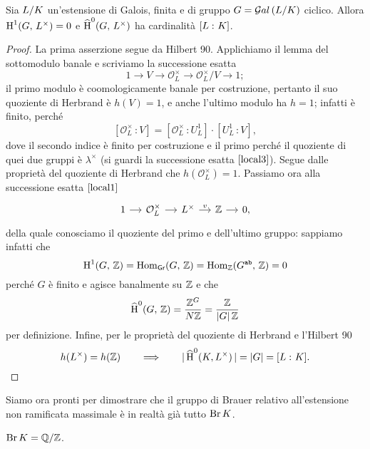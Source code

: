 \begin{theorem} \label{assioma}
	Sia $ L/K $ un'estensione di Galois, finita e di gruppo $ G = \mathcal{G}al\left( L/K \right) $ ciclico. Allora $ \operatorname{H}^1(G, \, L^\times) = 0 $ e $ \operatorname{\widehat{H}}^0(G, \, L^\times) $ ha cardinalità $ [L \, \colon K] $.
\end{theorem}
\begin{proof}
	La prima asserzione segue da Hilbert 90. Applichiamo il lemma del sottomodulo banale e scriviamo la successione esatta 
	\[ 1 \to V \to \mathcal{O}_L^\times \to \mathcal{O}_L^\times/V \to 1; \]
	il primo modulo è coomologicamente banale per costruzione, pertanto il suo quoziente di Herbrand è $ h(V) = 1 $, e anche l'ultimo modulo ha $ h = 1 $; infatti è finito, perché $$  [\mathcal{O}_L^\times \, \colon V] = [\mathcal{O}_L^\times \,\colon U_L^1]\cdot[U_L^1 \,\colon V],  $$
	dove il secondo indice è finito per costruzione e il primo perché il quoziente di quei due gruppi è $ \lambda^\times $ (si guardi la successione esatta $ \ref{local3} $). Segue dalle proprietà del quoziente di Herbrand che $ h(\mathcal{O}_L^\times) = 1 $. Passiamo ora alla successione esatta $ \ref{local1} $
	\[ \begin{tikzcd}[column sep = small]
	1 \rar
	& \mathcal{O}_{L}^\times \rar
	& L^\times \rar["v"]
	& \Z \rar
	& 0,
	\end{tikzcd} \]
	della quale conosciamo il quoziente del primo e dell'ultimo gruppo: sappiamo infatti che $$  \operatorname{H}^1(G, \, \mathbb{Z}) = \operatorname{Hom}_\mathsf{Gr}(G, \, \mathbb{Z}) = \operatorname{Hom}_{\mathbb{Z}}(G^\texttt{ab}, \, \mathbb{Z}) = 0  $$ perché $ G $ è finito e agisce banalmente su $ \mathbb{Z} $ e che $$  \operatorname{\widehat{H}}^0(G, \, \mathbb{Z}) = \frac{\mathbb{Z}^G}{ N\mathbb{Z}} = \frac{\mathbb{Z}}{ |G|\, \mathbb{Z}}  $$ per definizione. Infine, per le proprietà del quoziente di Herbrand e l'Hilbert 90
	\[ h(L^\times) = h(\mathbb{Z}) \qquad\Longrightarrow\qquad |\operatorname{\widehat{H}}^0(K, L^\times)\, | = |G| = [L \, \colon K]. \]
\end{proof}


Siamo ora pronti per dimostrare che il gruppo di Brauer relativo all'estensione non ramificata massimale è in realtà già tutto $ \operatorname{Br} K $.

\begin{theorem}
	$ \operatorname{Br} K = \mathbb{Q}/\mathbb{Z} $.
\end{theorem}

